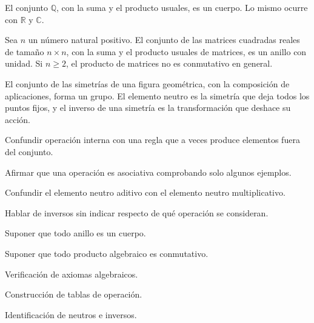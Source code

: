 \begin{ejemplo}
El conjunto \(\mathbb{Q}\), con la suma y el producto usuales, es un cuerpo. Lo mismo ocurre con \(\mathbb{R}\) y \(\mathbb{C}\).
\end{ejemplo}

\begin{ejemplo}[Matrices]
Sea \(n\) un número natural positivo. El conjunto de las matrices cuadradas reales de tamaño \(n\times n\), con la suma y el producto usuales de matrices, es un anillo con unidad. Si \(n\geq 2\), el producto de matrices no es conmutativo en general.
\end{ejemplo}

\begin{ejemplo}[Simetrías]
El conjunto de las simetrías de una figura geométrica, con la composición de aplicaciones, forma un grupo. El elemento neutro es la simetría que deja todos los puntos fijos, y el inverso de una simetría es la transformación que deshace su acción.
\end{ejemplo}

\begin{erroresfrecuentes}
  \item Confundir operación interna con una regla que a veces produce elementos fuera del conjunto.
  \item Afirmar que una operación es asociativa comprobando solo algunos ejemplos.
  \item Confundir el elemento neutro aditivo con el elemento neutro multiplicativo.
  \item Hablar de inversos sin indicar respecto de qué operación se consideran.
  \item Suponer que todo anillo es un cuerpo.
  \item Suponer que todo producto algebraico es conmutativo.
\end{erroresfrecuentes}

\begin{seminario}
  \item Verificación de axiomas algebraicos.
  \item Construcción de tablas de operación.
  \item Identificación de neutros e inversos.
\end{seminario}

